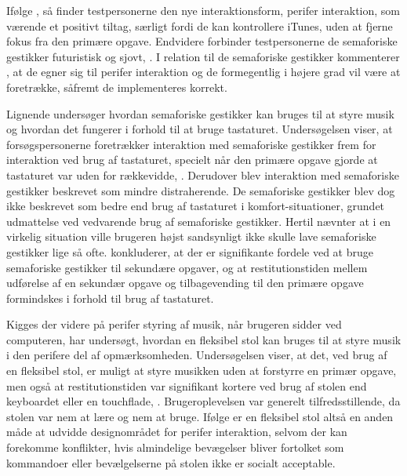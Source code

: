 Ifølge \textcite[ss. 173-174]{PDF:ComparingInputModalities}, så finder testpersonerne den nye interaktionsform, perifer interaktion, som værende et positivt tiltag, særligt fordi de kan kontrollere iTunes, uden at fjerne fokus fra den primære opgave. Endvidere forbinder testpersonerne de semaforiske gestikker futuristisk og sjovt, \parencite[s. 174]{PDF:ComparingInputModalities}. I relation til de semaforiske gestikker kommenterer \textcite[s. 177]{PDF:ComparingInputModalities}, at de egner sig til perifer interaktion og de formegentlig i højere grad vil være at foretrække, såfremt de implementeres korrekt.\blankline
%                    


   
   







 
 
  
  

Lignende \textcite{PDF:ComparingInputModalities} undersøger \textcite{PDF:AStudyOnTheUseOfSemaphoricGestures} hvordan semaforiske gestikker kan bruges til at styre musik og hvordan det fungerer i forhold til at bruge tastaturet. Undersøgelsen viser, at forsøgspersonerne foretrækker interaktion med semaforiske gestikker frem for interaktion ved brug af tastaturet, specielt når den primære opgave gjorde at tastaturet var uden for rækkevidde, \parencite[s. 1963]{PDF:AStudyOnTheUseOfSemaphoricGestures}. Derudover blev interaktion med semaforiske gestikker beskrevet som mindre distraherende. De semaforiske gestikker blev dog ikke beskrevet som bedre end brug af tastaturet i komfort-situationer, grundet udmattelse ved vedvarende brug af semaforiske gestikker. Hertil nævnter \textcite[s. 1963]{PDF:AStudyOnTheUseOfSemaphoricGestures} at i en virkelig situation ville brugeren højst sandsynligt ikke skulle lave semaforiske gestikker lige så ofte. \textcite[s. 1964]{PDF:AStudyOnTheUseOfSemaphoricGestures} konkluderer, at der er signifikante fordele ved at bruge semaforiske gestikker til sekundære opgaver, og at restitutionstiden mellem udførelse af en sekundær opgave og tilbagevending til den primære opgave formindskes i forhold til brug af tastaturet.

Kigges der videre på perifer styring af musik, når brugeren sidder ved computeren, har \textcite[ss. 5-9]{PDF:AChairAsUbiquitousInputDevice} undersøgt, hvordan en fleksibel stol kan bruges til at styre musik i den perifere del af opmærksomheden. Undersøgelsen viser, at det, ved brug af en fleksibel stol, er muligt at styre musikken uden at forstyrre en primær opgave, men også at restitutionstiden var signifikant kortere ved brug af stolen end keyboardet eller en touchflade, \parencite[s. 7]{PDF:AChairAsUbiquitousInputDevice}. Brugeroplevelsen var generelt tilfredsstillende, da stolen var nem at lære og nem at bruge. Ifølge \textcite[s. 8]{PDF:AChairAsUbiquitousInputDevice} er en fleksibel stol altså en anden måde at udvidde designområdet for perifer interaktion, selvom der kan forekomme konflikter, hvis almindelige bevægelser bliver fortolket som kommandoer eller bevælgelserne på stolen ikke er socialt acceptable.

